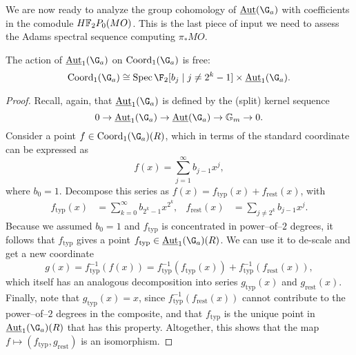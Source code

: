 We are now ready to analyze the group cohomology of \(\InternalAut(\G_a)\) with coefficients in the comodule \(\HFtwo P_0(MO)\).  This is the last piece of input we need to assess the Adams spectral sequence computing \(\pi_* MO\).
\begin{theorem}\label{CalculationOfAutGaActionOnMO}
The action of \(\InternalAut_1(\G_a)\) on \(\Coord_1(\G_a)\) is free: \[\Coord_1(\G_a) \cong \Spec \F_2[b_j \mid j \ne 2^k - 1] \times \InternalAut_1(\G_a).\]
\end{theorem}
\begin{proof}
Recall, again, that \(\InternalAut_1(\G_a)\) is defined by the (split) kernel sequence \[0 \to \InternalAut_1(\G_a) \to \InternalAut(\G_a) \to \Gm \to 0.\]  Consider a point \(f \in \Coord_1(\G_a)(R)\), which in terms of the standard coordinate can be expressed as \[f(x) = \sum_{j=1}^\infty b_{j-1} x^j,\] where \(b_0 = 1\).  Decompose this series as \(f(x) = f_{\mathrm{typ}}(x) + f_{\mathrm{rest}}(x)\), with
\begin{align*}
f_{\mathrm{typ}}(x) & = \sum_{k=0}^\infty b_{2^k-1} x^{2^k}, &
f_{\mathrm{rest}}(x) & = \sum_{j \ne 2^k} b_{j-1} x^j.
\end{align*}
Because we assumed \(b_0 = 1\) and \(f_{\mathrm{typ}}\) is concentrated in power--of--\(2\) degrees, it follows that \(f_{\mathrm{typ}}\) gives a point \(f_{\mathrm{typ}} \in \InternalAut_1(\G_a)(R)\).  We can use it to de-scale and get a new coordinate \[g(x) = f_{\mathrm{typ}}^{-1}(f(x)) = f_{\mathrm{typ}}^{-1}(f_{\mathrm{typ}}(x)) + f_{\mathrm{typ}}^{-1}(f_{\mathrm{rest}}(x)),\] which itself has an analogous decomposition into series \(g_{\mathrm{typ}}(x)\) and \(g_{\mathrm{rest}}(x)\).  Finally, note that \(g_{\mathrm{typ}}(x) = x\), since \(f_{\mathrm{typ}}^{-1}(f_{\mathrm{rest}}(x))\) cannot contribute to the power--of--\(2\) degrees in the composite, and that \(f_{\mathrm{typ}}\) is the unique point in \(\InternalAut_1(\G_a)(R)\) that has this property.  Altogether, this shows that the map \(f \mapsto (f_{\mathrm{typ}}, g_{\mathrm{rest}})\) is an isomorphism.
\end{proof}

